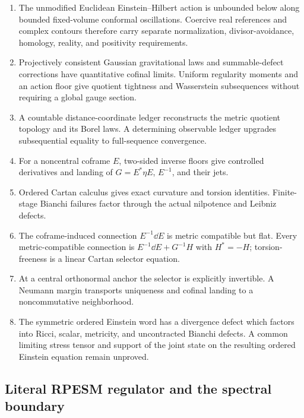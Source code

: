 \documentclass[11pt]{article}
\theoremstyle{remark}
\begin{document}
\begin{enumerate}[leftmargin=2.2em]
\item The unmodified Euclidean Einstein--Hilbert action is unbounded
      below along bounded fixed-volume conformal oscillations.
      Coercive real references and complex contours therefore carry
      separate normalization, divisor-avoidance, homology, reality,
      and positivity requirements.
\item Projectively consistent Gaussian gravitational laws and
      summable-defect corrections have quantitative cofinal limits.
      Uniform regularity moments and an action floor give quotient
      tightness and Wasserstein subsequences without requiring a
      global gauge section.
\item A countable distance-coordinate ledger reconstructs the
      metric quotient topology and its Borel laws.  A determining
      observable ledger upgrades subsequential equality to
      full-sequence convergence.
\item For a noncentral coframe \(E\), two-sided inverse floors give
      controlled derivatives and landing of
      \(G=E^*\eta E\), \(E^{-1}\), and their jets.
\item Ordered Cartan calculus gives exact curvature and torsion
      identities.  Finite-stage Bianchi failures factor through the
      actual nilpotence and Leibniz defects.
\item The coframe-induced connection \(E^{-1}\dd E\) is metric
      compatible but flat.  Every metric-compatible connection is
      \(E^{-1}\dd E+G^{-1}H\) with \(H^*=-H\); torsion-freeness is a
      linear Cartan selector equation.
\item At a central orthonormal anchor the selector is explicitly
      invertible.  A Neumann margin transports uniqueness and
      cofinal landing to a noncommutative neighborhood.
\item The symmetric ordered Einstein word has a divergence defect
      which factors into Ricci, scalar, metricity, and uncontracted
      Bianchi defects.  A common limiting stress tensor and support
      of the joint state on the resulting ordered Einstein equation
      remain unproved.
\end{enumerate}

\subsection{Literal RPESM regulator and the spectral boundary}
\end{document}

